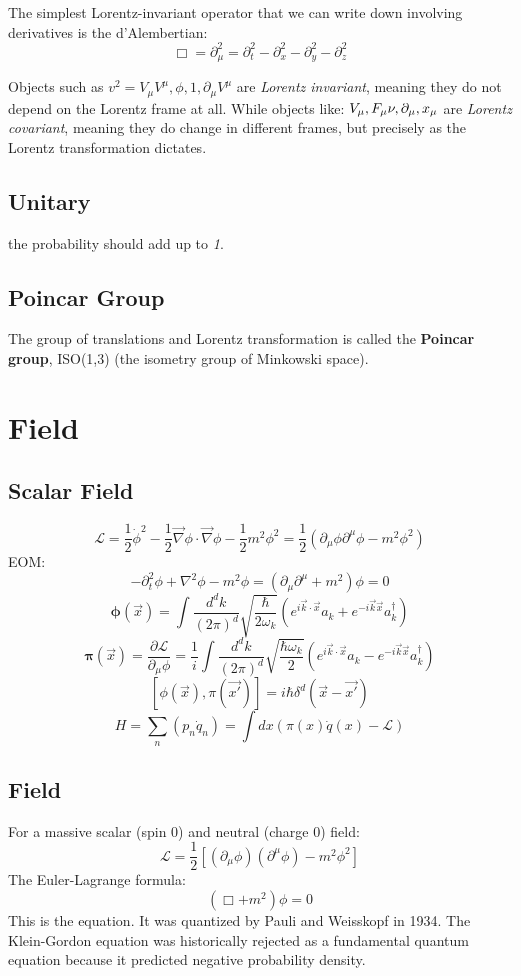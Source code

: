 The simplest Lorentz-invariant operator that we can write down involving
derivatives is the d'Alembertian:
\[ \Box = \partial_\mu^2 = \partial^2_t - \partial^2_x - \partial^2_y -
\partial^2_z \]

Objects such as $v^2 = V_\mu V^\mu, \phi, 1, \partial_\mu V^\mu$ are
\emph{Lorentz invariant}, meaning they do not depend on the Lorentz frame at
all. While objects like: $V_\mu, F_\mu\nu, \partial_\mu, x_\mu$ are
\emph{Lorentz covariant}, meaning they do change in different frames, but
precisely as the Lorentz transformation dictates.
\subsection{Unitary} the probability should add up to \emph{1}.

\subsection{Poincar Group} 
The group of translations and Lorentz transformation is called the \textbf{Poincar group}, 
ISO(1,3) (the isometry group of Minkowski space).

\section{Field}
\subsection{Scalar Field}
$$ \mathcal{L} = \frac{1}{2}\dot{\phi}^{2} -
\frac{1}{2}\vec{\nabla}\phi \cdot \vec{\nabla}\phi - \frac{1}{2}m^{2}\phi^{2} 
= \frac{1}{2}(\partial_{\mu}\phi\partial^{\mu}\phi - m^{2}\phi^{2})$$
EOM:
$$ -\partial_{t}^{2}\phi + \nabla^{2}\phi - m^{2}\phi =
(\partial_{\mu}\partial^{\mu} + m^{2}) \phi = 0 $$
$$ \pmb{\phi}(\vec{x}) = \int
\frac{d^{d}k}{(2\pi)^{d}}\sqrt{\frac{\hbar}{2\omega_{k}}}(e^{i\vec{k}\cdot\vec{x}}a_{k}+e^{-i\vec{k}\vec{x}}a_{k}^{\dag})$$
$$ \pmb{\pi}(\vec{x}) = \frac{\partial{\mathcal{L}}}{\partial_{\mu}\phi} =
\frac{1}{i} \int \frac{d^{d}k}{(2\pi)^{d}}\sqrt{\frac{\hbar\omega_{k}}{2}}(e^{i\vec{k}\cdot\vec{x}}a_{k}-e^{-i\vec{k}\vec{x}}a_{k}^{\dag}) $$
$$ [\phi(\vec{x}), \pi(\vec{x'})] = i\hbar\delta^{d}(\vec{x} - \vec{x'})$$
$$ H =\sum_{n}(p_{n}\dot{q}_n) = \int dx(\pi(x)\dot{q}(x) -
\mathcal{L})  $$


\subsection{\KG{} Field}
For a massive scalar (spin 0) and neutral (charge 0) field:
$$\mathcal{L} = \frac{1}{2} [(\partial_{\mu}\phi)(\partial^{\mu}\phi) -
m^{2} \phi^{2}]$$
The Euler-Lagrange formula:
$$ (\Box + m^{2})\phi = 0$$
This is the \KG{} equation. It was quantized by Pauli and Weisskopf in 1934.
The Klein-Gordon equation was historically rejected as a fundamental quantum
equation because it predicted negative probability density.

